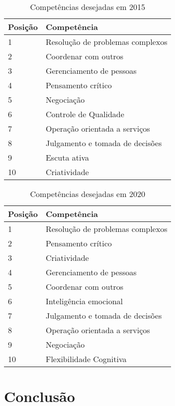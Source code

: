 \documentclass[
	12pt,				%
	openright,			%
	oneside,			%
	a4paper,			%
    tikz,
	english,			%
	french,				%
	spanish,			%
	brazil				%
	]{abntex2}
\begin{document}
\begin{table}[htb]
\ABNTEXfontereduzida{}
\caption{Competências desejadas em 2015}
\begin{tabular}{p{}|p{}}
   \textbf{Posição} & \textbf{Competência} \\
    \hline
    1 & Resolução de problemas complexos \\
    \hline
    2 & Coordenar com outros \\
    \hline
    3 & Gerenciamento de pessoas \\
    \hline
    4 & Pensamento crítico \\
    \hline
    5 & Negociação \\
    \hline
    6 & Controle de Qualidade \\
    \hline
    7 & Operação orientada a serviços \\
    \hline
    8 & Julgamento e tomada de decisões \\
    \hline
    9 & Escuta ativa \\
    \hline
    10 & Criatividade \\
\end{tabular}
\end{table}

\begin{table}[htb]
\ABNTEXfontereduzida{}
\caption{Competências desejadas em 2020}
\begin{tabular}{p{}|p{}}
   \textbf{Posição} & \textbf{Competência} \\
    \hline
    1 & Resolução de problemas complexos \\
    \hline
    2 & Pensamento crítico \\
    \hline
    3 & Criatividade \\
    \hline
    4 & Gerenciamento de pessoas \\
    \hline
    5 & Coordenar com outros \\
    \hline
    6 & Inteligência emocional \\
    \hline
    7 & Julgamento e tomada de decisões \\
    \hline
    8 & Operação orientada a serviços \\
    \hline
    9 & Negociação \\
    \hline
    10 & Flexibilidade Cognitiva \\
\end{tabular}
\end{table}

\chapter{Conclusão}
\end{document}
